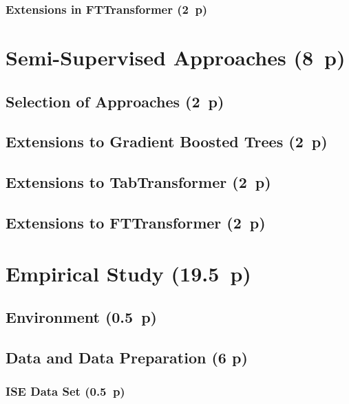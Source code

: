   \subsubsection{Extensions in
  FTTransformer (2~p)}\label{sec:extensions-in-fttransformer}


\newpage
\section{Semi-Supervised Approaches (8~p)}\label{sec:semi-supervised-approaches}

\subsection{Selection of Approaches (2~p)}\label{sec:selection-of-approaches-1}

\subsection{Extensions to Gradient Boosted
  Trees (2~p)}\label{sec:extensions-to-gradient-boosted-trees}

\subsection{Extensions to TabTransformer (2~p)}\label{sec:extensions-to-tabtransformer}

\subsection{Extensions to FTTransformer (2~p)}\label{sec:extensions-to-fttransformer}


\newpage
\section{Empirical Study (19.5~p)}\label{sec:empirical-study}

\subsection{Environment (0.5~p)}\label{sec:environment}

\subsection{Data and Data Preparation (6 p)}\label{sec:data-and-data-preparation}

\subsubsection{ISE Data Set (0.5~p)}\label{sec:ise-data-set}

